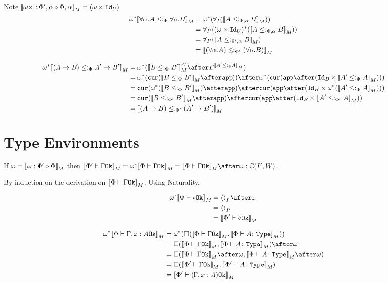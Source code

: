 \documentclass{report}
\begin{document}
Note ${\bf [\![}\omega\times : \Phi',\alpha \triangleright \Phi,\alpha{\bf ]\!]}_M = (\omega\times\texttt{Id}_{U})$
    \begin{align}
        \w\star\deno{\all{\a}{A}\subtypep\all{\a}{B}} &= \w\star(\allI(\deno{A\subtypepa B})) \\
        &=\allII((\w\times\Id{U})\star(\deno{A\subtypepa B}))\\
        &=\allII(\deno{A\subtypeppa B})\\
        &= \deno{(\all{\a}{A}) \subtypepp(\all{\a}{B})}\\
    \end{align}

\begin{align}
    \w\star\deno{(\ab)\subtypep\fntype{A'}{B'}} &= \w\star(\deno{B\subtypep B'}^{A'}\after B^{\deno{A'\subtypep A}})\\
    &= \w\star(\cur{\deno{B\subtypep B'}\after\app})\after\w\star(\cur{\app\after(\Id{B}\times\deno{A'\subtypep A})})\\
    & = \cur{\w\star(\deno{B\subtypep B'})\after\app}\after\cur{\app\after(\Id{B}\times\w\star(\deno{A'\subtypep A}))}\\
    & = \cur{\deno{B\subtypepp B'}\after\app}\after\cur{\app\after(\Id{B}\times\deno{A'\subtypepp A})}\\
    &= \deno{(\ab)\subtypepp(\fntype{A'}{B'})}
\end{align}

\section{Type Environments}
If $\omega = {\bf [\![}\omega : \Phi' \triangleright \Phi{\bf ]\!]}_M$ then $\deno{\wellformedok{\P'}{\G}} = \w\star\deno{\wellformedok{\P}{\G}} = \deno{\wellformedok{\P}{\G}}\after\w: \cipw$.

\proof
By induction on the derivation on ${\bf [\![}\Phi\vdash \Gamma \texttt{Ok}{\bf ]\!]}_M$. Using Naturality.

\begin{align}
    \w\star\deno{\wellformedok{\P}{\nil}} &= \term{I}\after\w\\
    &= \term{I'}\\
    &= \deno{\wellformedok{\P'}{\nil}}\\
\end{align}

\begin{align}
   \w\star\deno{\wellformedok{\P}{\gax}} &= \w\star(\square(\deno{\wellformedok{\P}{\G}},\deno{\typerelation{\P}{A}{\type}})) \\
    & = \square(\deno{\wellformedok{\P}{\G}},\deno{\typerelation{\P}{A}{\type}})\after\w\\
   & = \square(\deno{\wellformedok{\P}{\G}}\after\w, \deno{\typerelation{\P}{A}{\type}}\after\w)\\
    & = \square(\deno{\wellformedok{\P'}{\G}},\deno{\typerelation{\P'}{A}{\type}})\\
    & = \deno{\wellformedok{\P'}{(\gax)}}\\
\end{align}
\end{document}
